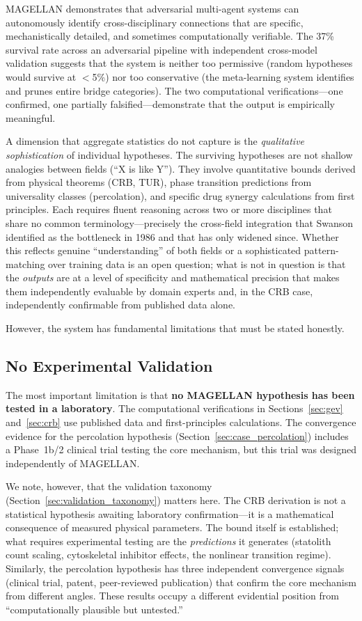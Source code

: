 MAGELLAN demonstrates that adversarial multi-agent systems can autonomously identify cross-disciplinary connections that are specific, mechanistically detailed, and sometimes computationally verifiable. The 37\% survival rate across an adversarial pipeline with independent cross-model validation suggests that the system is neither too permissive (random hypotheses would survive at $<$5\%) nor too conservative (the meta-learning system identifies and prunes entire bridge categories). The two computational verifications---one confirmed, one partially falsified---demonstrate that the output is empirically meaningful.

A dimension that aggregate statistics do not capture is the \emph{qualitative sophistication} of individual hypotheses. The surviving hypotheses are not shallow analogies between fields (``X is like Y''). They involve quantitative bounds derived from physical theorems (CRB, TUR), phase transition predictions from universality classes (percolation), and specific drug synergy calculations from first principles. Each requires fluent reasoning across two or more disciplines that share no common terminology---precisely the cross-field integration that Swanson identified as the bottleneck in 1986 and that has only widened since. Whether this reflects genuine ``understanding'' of both fields or a sophisticated pattern-matching over training data is an open question; what is not in question is that the \emph{outputs} are at a level of specificity and mathematical precision that makes them independently evaluable by domain experts and, in the CRB case, independently confirmable from published data alone.

However, the system has fundamental limitations that must be stated honestly.

\subsection{No Experimental Validation}

The most important limitation is that \textbf{no MAGELLAN hypothesis has been tested in a laboratory}. The computational verifications in Sections~\ref{sec:gev} and~\ref{sec:crb} use published data and first-principles calculations. The convergence evidence for the percolation hypothesis (Section~\ref{sec:case_percolation}) includes a Phase~1b/2 clinical trial testing the core mechanism, but this trial was designed independently of MAGELLAN.

We note, however, that the validation taxonomy (Section~\ref{sec:validation_taxonomy}) matters here. The CRB derivation is not a statistical hypothesis awaiting laboratory confirmation---it is a mathematical consequence of measured physical parameters. The bound itself is established; what requires experimental testing are the \emph{predictions} it generates (statolith count scaling, cytoskeletal inhibitor effects, the nonlinear transition regime). Similarly, the percolation hypothesis has three independent convergence signals (clinical trial, patent, peer-reviewed publication) that confirm the core mechanism from different angles. These results occupy a different evidential position from ``computationally plausible but untested.''

